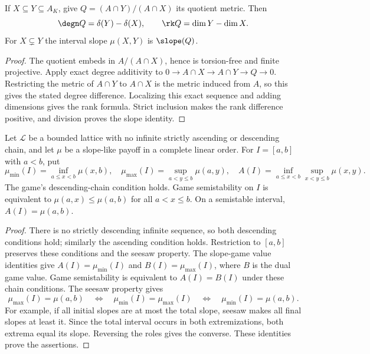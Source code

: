 \begin{lemma}
\label{lem:hermitian-quotient-interval-slope}
\leanok
If $X\subseteq Y\subseteq A_K$, give
$Q=(A\cap Y)/(A\cap X)$ its quotient metric. Then
\[
 \degn Q=\delta(Y)-\delta(X),\qquad
 \rk Q=\dim Y-\dim X.
\]
For $X\subsetneq Y$ the interval slope $\mu(X,Y)$ is $\slope(Q)$.
\end{lemma}
\begin{proof}
The quotient embeds in $A/(A\cap X)$, hence is torsion-free and finite
projective. Apply exact degree additivity to
$0\to A\cap X\to A\cap Y\to Q\to0$. Restricting the metric
of $A\cap Y$ to $A\cap X$ is the metric induced from $A$, so this
gives the stated degree difference. Localizing this exact sequence and
adding dimensions gives the rank formula. Strict inclusion makes the
rank difference positive, and division proves the slope identity.
\end{proof}

\begin{lemma}
\label{lem:finite-length-slope-game}
\leanok
Let $\mathcal L$ be a bounded lattice with no infinite strictly ascending
or descending chain, and let $\mu$ be a slope-like payoff in a complete
linear order. For $I=[a,b]$ with $a<b$, put
\[
 \mu_{\min}(I)=\inf_{a\leq x<b}\mu(x,b),\quad
 \mu_{\max}(I)=\sup_{a<y\leq b}\mu(a,y),\quad
 A(I)=\inf_{a\leq x<b}\sup_{x<y\leq b}\mu(x,y).
\]
The game's descending-chain condition holds. Game semistability on $I$
is equivalent to $\mu(a,x)\leq\mu(a,b)$ for all $a<x\leq b$.
On a semistable interval, $A(I)=\mu(a,b)$.
\end{lemma}
\begin{proof}
There is no strictly descending infinite sequence, so both descending
conditions hold; similarly the ascending condition holds. Restriction
to $[a,b]$ preserves these conditions and the seesaw property.
The slope-game value identities give $A(I)=\mu_{\min}(I)$ and
$B(I)=\mu_{\max}(I)$, where $B$ is the dual game value. Game
semistability is equivalent to $A(I)=B(I)$ under these chain conditions.
The seesaw property gives
\[
 \mu_{\max}(I)=\mu(a,b)
 \quad\Longleftrightarrow\quad
 \mu_{\min}(I)=\mu_{\max}(I)
 \quad\Longleftrightarrow\quad
 \mu_{\min}(I)=\mu(a,b).
\]
For example, if all initial slopes are at most the total slope, seesaw
makes all final slopes at least it. Since the total interval occurs in
both extremizations, both extrema equal its slope. Reversing the roles
gives the converse. These identities prove the assertions.
\end{proof}

